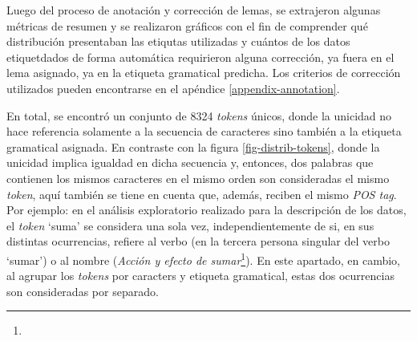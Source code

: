 Luego del proceso de anotación y corrección de lemas, se extrajeron algunas métricas
de resumen y se realizaron gráficos con el fin de comprender qué distribución
presentaban las etiqutas utilizadas y cuántos de los datos etiquetdados de forma
automática requirieron alguna corrección, ya fuera en el lema asignado, ya en
la etiqueta gramatical predicha. Los criterios de corrección utilizados pueden
encontrarse en el apéndice \ref{appendix-annotation}.
\par
En total, se encontró un conjunto de 8324 \textit{tokens} únicos, donde la unicidad no
hace referencia solamente a la secuencia de caracteres sino también a la etiqueta
gramatical asignada. En contraste con la figura \ref{fig-distrib-tokens}, donde
la unicidad implica igualdad en dicha secuencia y, entonces, dos palabras que
contienen los mismos caracteres en el mismo orden son consideradas el mismo
\textit{token}, aquí también se tiene en cuenta que, además, reciben el mismo
\textit{POS tag}. Por ejemplo: en el análisis exploratorio realizado
para la descripción de los datos, el \textit{token} `suma' se considera una sola vez,
independientemente de si, en sus distintas ocurrencias, refiere al verbo
(en la tercera persona singular del verbo `sumar') o al nombre
(\textit{Acción y efecto de sumar}\footnote{}). En
este apartado, en cambio, al agrupar los \textit{tokens} por caracters y etiqueta
gramatical, estas dos ocurrencias son consideradas por separado.
\par
